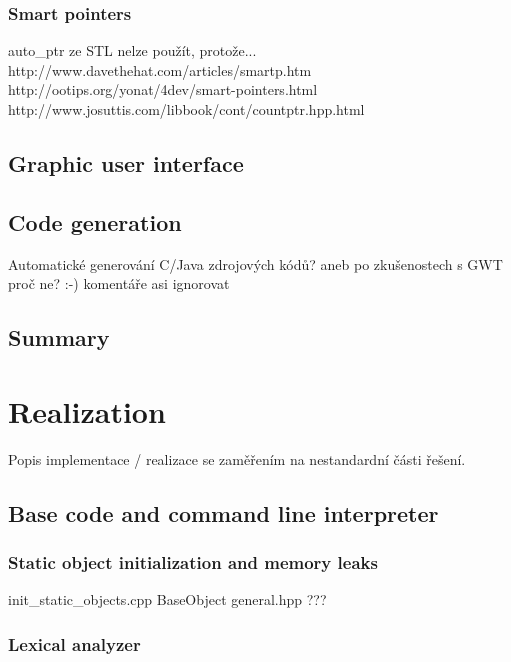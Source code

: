 \documentclass[11pt,twoside,a4paper]{book}
\begin{document}
\subsection{Smart pointers}

auto\_ptr ze STL nelze použít, protože...
http://www.davethehat.com/articles/smartp.htm
http://ootips.org/yonat/4dev/smart-pointers.html
http://www.josuttis.com/libbook/cont/countptr.hpp.html


\section{Graphic user interface}


\section{Code generation}

Automatické generování C/Java zdrojových kódů?
	aneb po zkušenostech s GWT proč ne? :-)
	komentáře asi ignorovat


\section{Summary}




\chapter{Realization}

Popis implementace / realizace se zaměřením na nestandardní části řešení.

\section{Base code and command line interpreter}

\subsection{Static object initialization and memory leaks}

init\_static\_objects.cpp
BaseObject
general.hpp ???

\subsection{Lexical analyzer}
\end{document}
